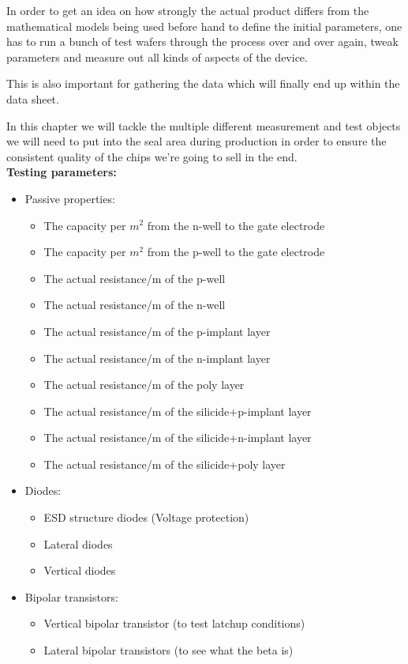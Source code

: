 In order to get an idea on how strongly the actual product differs from the mathematical models being used before hand to define the initial parameters, one has to run a bunch of test wafers through the process over and over again, tweak parameters and measure out all kinds of aspects of the device.

This is also important for gathering the data which will finally end up within the data sheet.

In this chapter we will tackle the multiple different measurement and test objects we will need to put into the seal area during production in order to ensure the consistent quality of the chips we're going to sell in the end.\\



\textbf{Testing parameters:}
\begin{itemize}
	\item Passive properties:
	\begin{itemize}
		\item The capacity per $m^2$ from the n-well to the gate electrode
		\item The capacity per $m^2$ from  the p-well to the gate electrode
		\item The actual resistance/m of the p-well
		\item The actual resistance/m of the n-well
		\item The actual resistance/m of the p-implant layer
		\item The actual resistance/m of the n-implant layer
		\item The actual resistance/m of the poly layer
		\item The actual resistance/m of the silicide+p-implant layer
		\item The actual resistance/m of the silicide+n-implant layer
		\item The actual resistance/m of the silicide+poly layer
	\end{itemize}

	\item Diodes:
	\begin{itemize}
		\item ESD structure diodes (Voltage protection)
		\item Lateral diodes
		\item Vertical diodes
	\end{itemize}

	\item Bipolar transistors:
	\begin{itemize}
		\item Vertical bipolar transistor (to test latchup conditions)
		\item Lateral bipolar transistors (to see what the beta is)
	\end{itemize}


\end{itemize}
